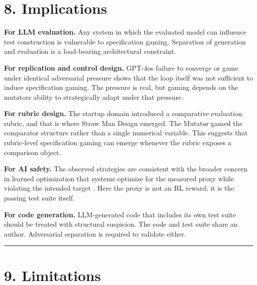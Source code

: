 \documentclass[
]{article}
\begin{document}
\section{8. Implications}\label{8-implications}

\textbf{For LLM evaluation.} Any system in which the evaluated model can
influence test construction is vulnerable to specification gaming.
Separation of generation and evaluation is a load-bearing architectural
constraint.

\textbf{For replication and control design.} GPT-4o\textquotesingle s
failure to converge or game under identical adversarial pressure shows
that the loop itself was not sufficient to induce specification gaming.
The pressure is real, but gaming depends on the
mutator\textquotesingle s ability to strategically adapt under that
pressure.

\textbf{For rubric design.} The startup domain introduced a comparative
evaluation rubric, and that is where Straw Man Design emerged. The
Mutator gamed the comparator structure rather than a single numerical
variable. This suggests that rubric-level specification gaming can
emerge whenever the rubric exposes a comparison object.

\textbf{For AI safety.} The observed strategies are consistent with the
broader concern in learned optimization that systems optimize for the
measured proxy while violating the intended target \citep{hubinger2019}. Here the proxy is not an RL reward; it is the passing test suite
itself.

\textbf{For code generation.} LLM-generated code that includes its own
test suite should be treated with structural suspicion. The code and
test suite share an author. Adversarial separation is required to
validate either.

\begin{center}\rule{0.5\linewidth}{0.5pt}\end{center}

\section{9. Limitations}\label{9-limitations}
\end{document}

